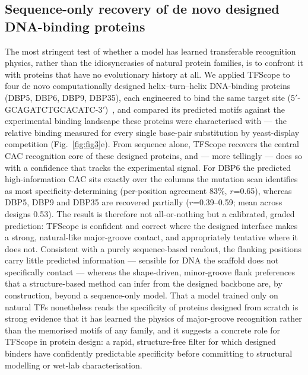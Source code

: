 \documentclass[11pt,letterpaper]{article}
\begin{document}
\subsection*{Sequence-only recovery of de novo designed DNA-binding proteins}
The most stringent test of whether a model has learned transferable recognition physics, rather
than the idiosyncrasies of natural protein families, is to confront it with proteins that have no
evolutionary history at all. We applied TFScope to four de novo computationally designed
helix--turn--helix DNA-binding proteins (DBP5, DBP6, DBP9, DBP35), each engineered to bind the
same target site (5$'$-GCAGATCTGCACATC-3$'$)~\cite{Glasscock2025}, and compared its predicted
motifs against the experimental binding landscape these proteins were characterised with --- the
relative binding measured for every single base-pair substitution by yeast-display competition
(Fig.~\ref{fig:fig3}e). From sequence alone, TFScope recovers the central CAC recognition core of
these designed proteins, and --- more tellingly --- does so with a confidence that tracks the
experimental signal. For DBP6 the predicted high-information CAC sits exactly over the columns the
mutation scan identifies as most specificity-determining (per-position agreement 83\%, $r$=0.65),
whereas DBP5, DBP9 and DBP35 are recovered partially ($r$=0.39--0.59; mean across designs 0.53).
The result is therefore not all-or-nothing but a calibrated, graded prediction: TFScope is
confident and correct where the designed interface makes a strong, natural-like major-groove
contact, and appropriately tentative where it does not. Consistent with a purely sequence-based
readout, the flanking positions carry little predicted information --- sensible for DNA the scaffold
does not specifically contact --- whereas the shape-driven, minor-groove flank preferences that a
structure-based method can infer from the designed backbone are, by construction, beyond a
sequence-only model. That a model trained only on natural TFs nonetheless reads the specificity of
proteins designed from scratch is strong evidence that it has learned the physics of major-groove
recognition rather than the memorised motifs of any family, and it suggests a concrete role for
TFScope in protein design: a rapid, structure-free filter for which designed binders have
confidently predictable specificity before committing to structural modelling or wet-lab
characterisation.
\end{document}
